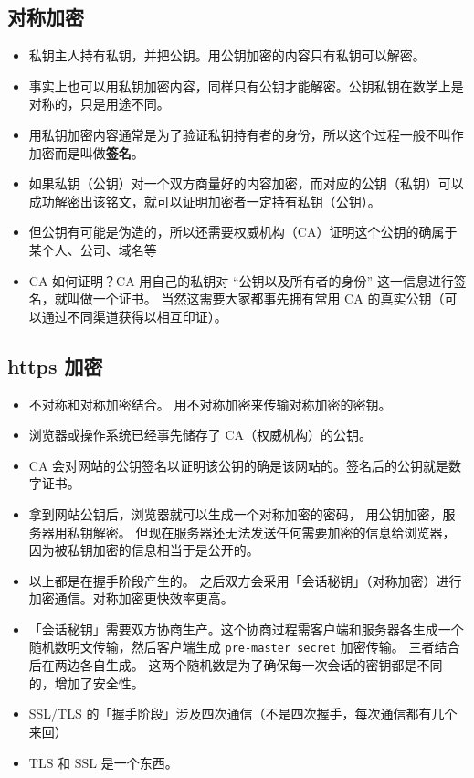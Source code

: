
\subsection{对称加密}
\begin{itemize}
\item 私钥主人持有私钥，并把公钥。用公钥加密的内容只有私钥可以解密。
\item 事实上也可以用私钥加密内容，同样只有公钥才能解密。公钥私钥在数学上是对称的，只是用途不同。
\item 用私钥加密内容通常是为了验证私钥持有者的身份，所以这个过程一般不叫作加密而是叫做\textbf{签名}。
\item 如果私钥（公钥）对一个双方商量好的内容加密，而对应的公钥（私钥）可以成功解密出该铭文，就可以证明加密者一定持有私钥（公钥）。
\item 但公钥有可能是伪造的，所以还需要权威机构（CA）证明这个公钥的确属于某个人、公司、域名等
\item CA 如何证明？CA 用自己的私钥对 “公钥以及所有者的身份” 这一信息进行签名，就叫做一个证书。 当然这需要大家都事先拥有常用 CA 的真实公钥（可以通过不同渠道获得以相互印证）。
\end{itemize}

\subsection{https 加密}
\begin{itemize}
\item 不对称和对称加密结合。 用不对称加密来传输对称加密的密钥。
\item 浏览器或操作系统已经事先储存了 CA（权威机构）的公钥。
\item CA 会对网站的公钥签名以证明该公钥的确是该网站的。签名后的公钥就是数字证书。
\item 拿到网站公钥后，浏览器就可以生成一个对称加密的密码， 用公钥加密，服务器用私钥解密。 但现在服务器还无法发送任何需要加密的信息给浏览器，因为被私钥加密的信息相当于是公开的。
\item 以上都是在握手阶段产生的。 之后双方会采用「会话秘钥」（对称加密）进行加密通信。对称加密更快效率更高。
\item 「会话秘钥」需要双方协商生产。这个协商过程需客户端和服务器各生成一个随机数明文传输，然后客户端生成 \verb`pre-master secret` 加密传输。 三者结合后在两边各自生成。 这两个随机数是为了确保每一次会话的密钥都是不同的，增加了安全性。
\item SSL/TLS 的「握手阶段」涉及四次通信（不是四次握手，每次通信都有几个来回）
\item TLS 和 SSL 是一个东西。
\end{itemize}
